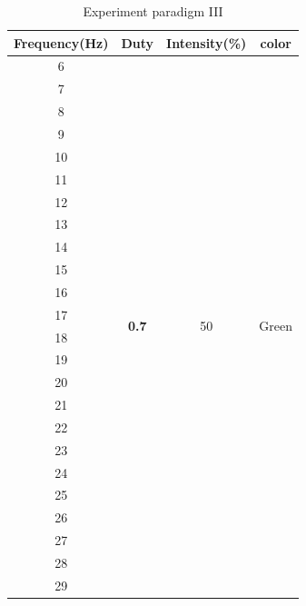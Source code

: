 \begin{table}[ht]
\centering
\begin{tabular}{| c | c | c | c |}
	\hline 
    \textbf{Frequency(Hz)}&\textbf{Duty}&\textbf{Intensity(\%)}&\textbf{color}\\
    \hline
    6&\multirow{24}{*}{\textbf{0.7}}&
    \multirow{24}{*}{50}&
    \multirow{24}{*}{Green}\\
    \cline{1-1}
    7&&&\\\cline{1-1}
    8&&&\\ \cline{1-1}
    9&&&\\ \cline{1-1}
    10&&&\\ \cline{1-1}
    11&&&\\ \cline{1-1}
    12&&&\\ \cline{1-1}
    13&&&\\\cline{1-1}
    14&&&\\ \cline{1-1}
    15&&&\\ \cline{1-1}
    16&&&\\ \cline{1-1}
    17&&&\\ \cline{1-1}
    18&&&\\ \cline{1-1}
    19&&&\\ \cline{1-1}
    20&&&\\ \cline{1-1}
    21&&&\\ \cline{1-1}
    22&&&\\ \cline{1-1}
    23&&&\\ \cline{1-1}
    24&&&\\ \cline{1-1}
    25&&&\\ \cline{1-1}
    26&&&\\ \cline{1-1}
    27&&&\\ \cline{1-1}
    28&&&\\ \cline{1-1}
    29&&&\\ 
    \hline
	\end{tabular}       
\caption{Experiment paradigm III}
\label{table:paradigm_3}
\end{table}


